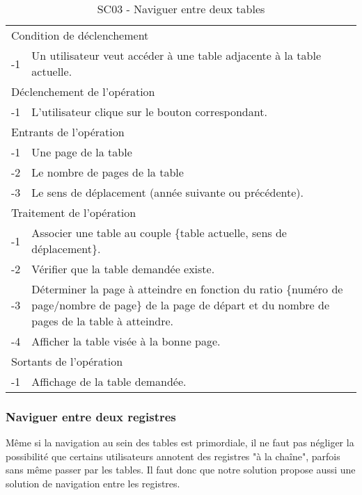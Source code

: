 \documentclass[a4paper]{article}
\begin{document}
\begin{table}[H]
  \centering
   \small
	\begin{tabular}{|c|p{12cm}|}
   		\hline
   			\rowcolor{lightgray}\multicolumn{2}{|c|}{\textbf{SC03 - Naviguer entre deux tables}} \\
   		\hline
   			\multicolumn{2}{|l|}{Condition de d\'eclenchement} \\
   		\hline
   		-1 & Un utilisateur veut acc\'eder \`a une table adjacente à la table actuelle. \\
   		\hline
   			\multicolumn{2}{|l|}{D\'eclenchement de l'op\'eration} \\
   		\hline
   			-1 & L'utilisateur clique sur le bouton correspondant. \\
   		\hline
   			\multicolumn{2}{|l|}{Entrants de l'op\'eration} \\
   		\hline
   			-1 & Une page de la table \\
        	-2 & Le nombre de pages de la table \\ 
            -3 & Le sens de déplacement (année suivante ou précédente). \\
   		\hline
   			\multicolumn{2}{|l|}{Traitement de l'op\'eration} \\
  		\hline
   			-1 & Associer une table au couple \{table actuelle, sens de d\'eplacement\}.  \\
        	-2 & V\'erifier que la table demand\'ee existe. \\
        	-3 & Déterminer la page à atteindre en fonction du ratio \{numéro de page/nombre de page\} de la page de départ et du nombre de pages de la table à atteindre. \\
            -4 & Afficher la table visée à la bonne page. \\
   		\hline
   			\multicolumn{2}{|l|}{Sortants de l'op\'eration} \\
   		\hline
   			-1 & Affichage de la table demand\'ee. \\
   		\hline
	\end{tabular}
  \caption{SC03 - Naviguer entre deux tables}
  \normalsize
  \label{tab:naviguer_deux_tables}
\end{table}
\newpage

\subsubsection{Naviguer entre deux registres}

Même si la navigation au sein des tables est primordiale, il ne faut pas négliger la possibilité que certains utilisateurs annotent des registres "à la chaîne", parfois sans même passer par les tables. Il faut donc que notre solution propose aussi une solution de navigation entre les registres.
\end{document}
